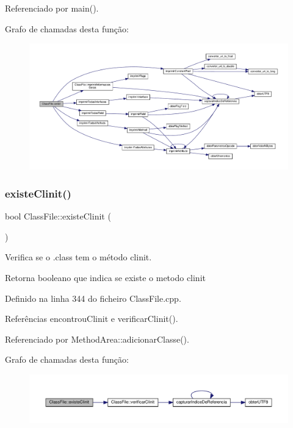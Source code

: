 Referenciado por main().

Grafo de chamadas desta função\+:
\nopagebreak
\begin{figure}[H]
\begin{center}
\leavevmode
\includegraphics[width=350pt]{classClassFile_a7da7cc6de8de3fc6f27faf3b76f4883a_cgraph}
\end{center}
\end{figure}
\mbox{\label{classClassFile_a2a886bdb4c42bfaaf5ea8ff1b2c41209}} 
\subsubsection{\texorpdfstring{existe\+Clinit()}{existeClinit()}}
{\footnotesize\ttfamily bool Class\+File\+::existe\+Clinit (\begin{DoxyParamCaption}{ }\end{DoxyParamCaption})}



Verifica se o .class tem o método clinit. 

\begin{DoxyReturn}{Retorna}
booleano que indica se existe o metodo clinit 
\end{DoxyReturn}


Definido na linha 344 do ficheiro Class\+File.\+cpp.



Referências encontrou\+Clinit e verificar\+Clinit().



Referenciado por Method\+Area\+::adicionar\+Classe().

Grafo de chamadas desta função\+:
\nopagebreak
\begin{figure}[H]
\begin{center}
\leavevmode
\includegraphics[width=350pt]{classClassFile_a2a886bdb4c42bfaaf5ea8ff1b2c41209_cgraph}
\end{center}
\end{figure}
\mbox{\label{classClassFile_a10bfe22492b473fb0197e55f451978e5}} 
